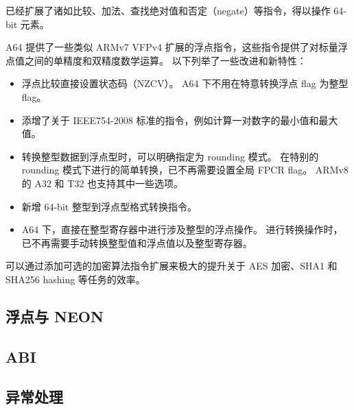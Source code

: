 已经扩展了诸如比较、加法、查找绝对值和否定（negate）等指令，得以操作 64-bit 元素。


A64 提供了一些类似 ARMv7 VFPv4 扩展的浮点指令，这些指令提供了对标量浮点值之间的单精度和双精度数学运算。
以下列举了一些改进和新特性：

\begin{itemize}
  \item 浮点比较直接设置状态码（NZCV）。
    A64 下不用在特意转换浮点 flag 为整型 flag。
  \item 添增了关于 IEEE754-2008 标准的指令，例如计算一对数字的最小值和最大值。
  \item 转换整型数据到浮点型时，可以明确指定为 rounding 模式。
    在特别的 rounding 模式下进行的简单转换，已不再需要设置全局 FPCR flag。
    ARMv8 的 A32 和 T32 也支持其中一些选项。
  \item 新增 64-bit 整型到浮点型格式转换指令。
  \item A64 下，直接在整型寄存器中进行涉及整型的浮点操作。
    进行转换操作时，已不再需要手动转换整型值和浮点值以及整型寄存器。
\end{itemize}


可以通过添加可选的加密算法指令扩展来极大的提升关于 AES 加密、SHA1 和 SHA256 hashing 等任务的效率。

\subsection{浮点与 NEON} \label{sec:floating-neon}

\subsection{ABI}

\subsection{异常处理} \label{sec:exception}


